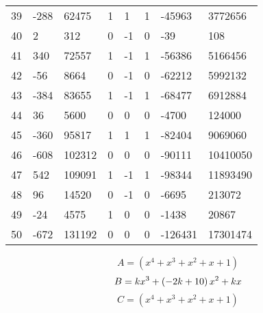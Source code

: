 \documentclass{amsart}
\begin{document}
\begin{longtable}{|l|l|l|lllll|}
39&-288&62475&1&1&1&-45963&3772656\\
40&2&312&0&-1&0&-39&108\\
41&340&72557&1&-1&1&-56386&5166456\\
42&-56&8664&0&-1&0&-62212&5992132\\
43&-384&83655&1&-1&1&-68477&6912884\\
44&36&5600&0&0&0&-4700&124000\\
45&-360&95817&1&1&1&-82404&9069060\\
46&-608&102312&0&0&0&-90111&10410050\\
47&542&109091&1&-1&1&-98344&11893490\\
48&96&14520&0&-1&0&-6695&213072\\
49&-24&4575&1&0&0&-1438&20867\\
50&-672&131192&0&0&0&-126431&17301474\\
\hline
\end{longtable}
$$A=(x^4
 + x^3
 + x^2
 + x
 + 1)$$
$$B=k\*x^3
 + \left(-2\*k
 + 10\right) \*x^2
 + k\*x$$
$$C=(x^4
 + x^3
 + x^2
 + x
 + 1)$$
\end{document}
